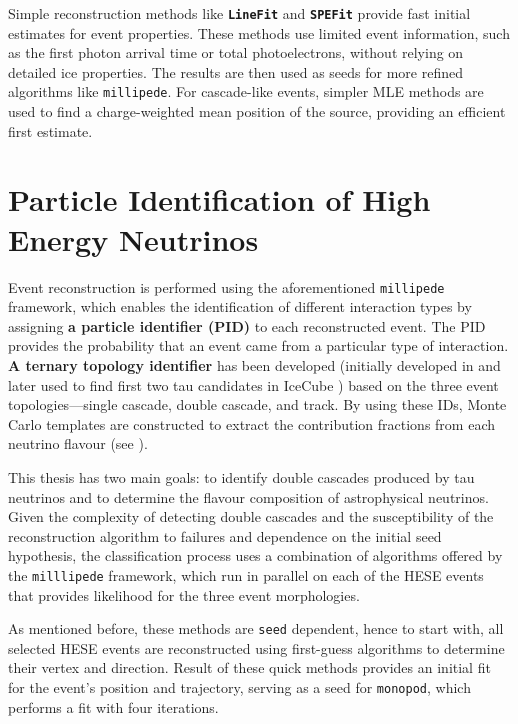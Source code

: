 Simple reconstruction methods like \textbf{\texttt{LineFit}} and \textbf{\texttt{SPEFit}} provide fast initial estimates for event properties. These methods use limited event information, such as the first photon arrival time or total photoelectrons, without relying on detailed ice properties. The results are then used as seeds for more refined algorithms like \texttt{millipede}. For cascade-like events, simpler MLE methods are used to find a charge-weighted mean position of the source, providing an efficient first estimate.

\section{Particle Identification of High Energy Neutrinos}
\label{sec:PID}
Event reconstruction is performed using the aforementioned \texttt{millipede} framework, which enables the identification of different interaction types by assigning \textbf{a particle identifier (PID)} to each reconstructed event. The PID provides the probability that an event came from a particular type of interaction. \textbf{A ternary topology identifier} has been developed (initially developed in \cite{marcel_thesis} and later used to find first two tau candidates in IceCube ) based on the three event topologies—single cascade, double cascade, and track. By using these IDs, Monte Carlo templates are constructed to extract the contribution fractions from each neutrino flavour (see ).

This thesis has two main goals: to identify double cascades produced by tau neutrinos and to determine the flavour composition of astrophysical neutrinos. Given the complexity of detecting double cascades and the susceptibility of the reconstruction algorithm to failures and dependence on the initial seed hypothesis, the classification process uses a combination of algorithms offered by the \texttt{milllipede} framework, which run in parallel on each of the HESE events that provides likelihood for the three event morphologies. 

As mentioned before, these methods are \texttt{seed} dependent, hence to start with, all selected HESE events are reconstructed using first-guess algorithms to determine their vertex and direction. Result of these quick methods provides an initial fit for the event's position and trajectory, serving as a seed for \texttt{monopod}, which performs a fit with four iterations. \newpage

